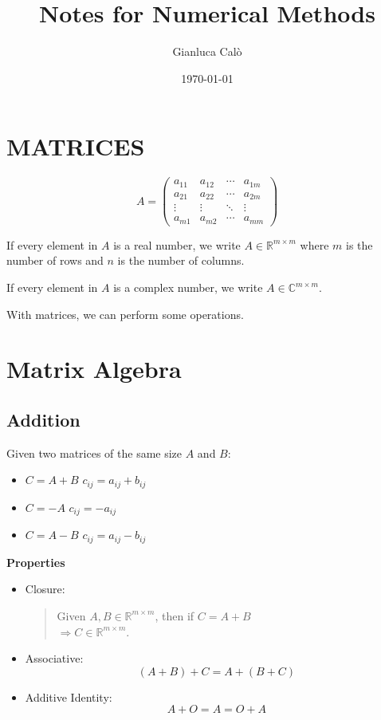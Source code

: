 \documentclass[a4paper, 12pt]{article}
\title{Notes for Numerical Methods}
\author{Gianluca Calò}
\date{\today}
\begin{document}
\section{MATRICES}


\[
A = \begin{pmatrix}
a_{11} & a_{12} & \cdots & a_{1m} \\
a_{21} & a_{22} & \cdots & a_{2m} \\
\vdots & \vdots & \ddots & \vdots \\
a_{m1} & a_{m2} & \cdots & a_{mm}
\end{pmatrix}
\]

If every element in $A$ is a real number, we write $A \in \mathbb{R}^{m \times m}$ where $m$ is the number of rows and $n$ is the number of columns.

If every element in $A$ is a complex number, we write $A \in \mathbb{C}^{m \times m}$.

With matrices, we can perform some operations.

\section{Matrix Algebra}

\subsection{Addition}
Given two matrices of the same size $A$ and $B$:
\begin{itemize}
    \item $C = A + B$ \quad $c_{ij} = a_{ij} + b_{ij}$
    \item $C = -A$ \quad $c_{ij} = -a_{ij}$
    \item $C = A - B$ \quad $c_{ij} = a_{ij} - b_{ij}$
\end{itemize}

\textbf{Properties}
\begin{itemize}
    \item Closure:
    \begin{quote}
    Given $A, B \in \mathbb{R}^{m \times m}$, then if $C = A + B$ \\
    $\Rightarrow C \in \mathbb{R}^{m \times m}$.
    \end{quote}
    
    \item Associative:
    \begin{equation*}
    (A + B) + C = A + (B + C)
    \end{equation*}
    
    \item Additive Identity:
    \begin{equation*}
    A + O = A = O + A
    \end{equation*}
\end{itemize}
\end{document}
